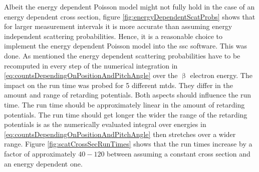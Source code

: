 Albeit the energy dependent Poisson model might not fully hold in the case of an energy dependent cross section, figure \ref{fig:energyDependentScatProbs} shows that for larger measurement intervals it is more accurate than assuming energy independent scattering probabilities. Hence, it is a reasonable choice to implement the energy dependent Poisson model into the \gls{ssc} software. This was done. As mentioned the energy dependent scattering probabilities have to be recomputed in every step of the numerical integration in \eqref{eq:countsDependingOnPositionAndPitchAngle} over the $\upbeta$ electron energy. The impact on the run time was probed for 5 different \gls{mtd}s. They differ in the amount and range of retarding potentials. Both aspects should influence the run time. The run time should be approximately linear in the amount of retarding potentials. The run time should get longer the wider the range of the retarding potentials is as the numerically evaluated integral over energies in \eqref{eq:countsDependingOnPositionAndPitchAngle} then stretches over a wider range. Figure \ref{fig:scatCrossSecRunTimes} shows that the run times increase by a factor of approximately $40-120$ between assuming a constant cross section and an energy dependent one.

